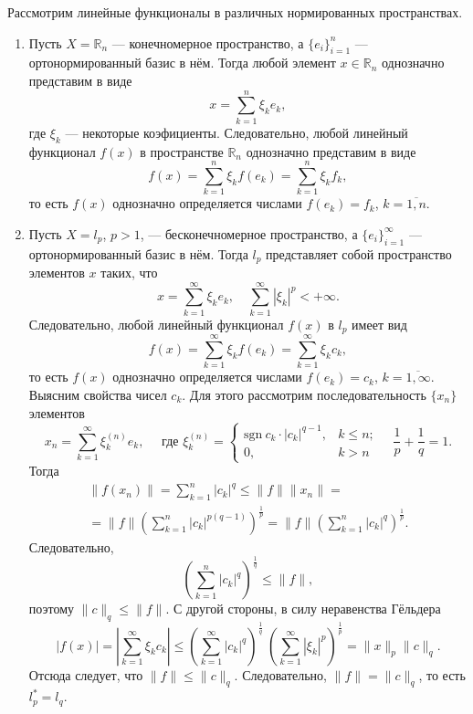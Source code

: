 \documentclass[12pt,a4paper, titlepage]{article}
\begin{document}
Рассмотрим линейные функционалы в различных нормированных пространствах.

\begin{enumerate}
\item
Пусть $X = \mathbb{R}_n$ --- конечномерное пространство, а $\lbrace e_i \rbrace_{i=1}^n$ --- ортонормированный базис в нём. Тогда любой элемент $x \in \mathbb{R}_n$ однозначно представим в виде 
$$
x = \sum_{k=1}^n \xi_k e_k,
$$
где $\xi_k$ --- некоторые коэфициенты. Следовательно, любой линейный функционал $f(x)$ в пространстве $\mathbb{R}_n$ однозначно представим в виде
$$
f(x) = \sum_{k=1}^n \xi_k f(e_k) = \sum_{k=1}^n \xi_k f_k,
$$
то есть $f(x)$ однозначно определяется числами $f(e_k) = f_k$, $k = \overline{1, n}$.

\item
Пусть $X = l_p$, $p > 1$, --- бесконечномерное пространство, а $\lbrace e_i \rbrace_{i=1}^\infty$ --- ортонормированный базис в нём. Тогда $l_p$ представляет собой пространство элементов $x$ таких, что
$$
x = \sum_{k=1}^\infty \xi_k e_k, \quad \sum_{k=1}^\infty |\xi_k |^p < +\infty.
$$
Следовательно, любой линейный функционал $f(x)$ в $l_p$ имеет вид
$$
f(x) = \sum_{k=1}^\infty \xi_k f(e_k) = \sum_{k=1}^\infty \xi_k c_k,
$$
то есть $f(x)$ однозначно определяется числами $f(e_k) = c_k$, $k = \overline{1, \infty}$. Выясним свойства чисел $c_k$. Для этого рассмотрим последовательность $\lbrace x_n \rbrace$ элементов
$$
x_n = \sum_{k=1}^\infty \xi_k^{(n)} e_k, \quad \text{ где } 
\xi_k^{(n)} = \begin{cases}
\mathrm{sgn} \ c_k  \cdot |c_k|^{q-1}, & k \leqslant n; \\
0, & k > n
\end{cases} \quad \frac 1 p + \frac 1 q = 1.
$$
Тогда
\begin{multline*}
\|f(x_n)\| = \sum_{k=1}^n |c_k|^q \leqslant \|f\| \|x_n\| = \\
= \|f\| \left( \sum_{k=1}^n |c_k|^{p(q-1)} \right)^{\frac 1 p} =
\|f\| \left( \sum_{k=1}^n |c_k|^q \right)^{\frac 1 p}.
\end{multline*}
Следовательно,
$$
\left( \sum_{k=1}^n |c_k|^q \right)^{\frac 1 q} \leqslant \|f\|,
$$
поэтому $\|c\|_q \leqslant \|f\|$.
С другой стороны, в силу неравенства Гёльдера
$$
|f(x)| = \left| \sum_{k=1}^\infty \xi_k c_k \right| \leqslant
\left( \sum_{k=1}^\infty |c_k|^q \right)^{\frac 1 q} \ \left( \sum_{k=1}^\infty |\xi_k|^p \right)^{\frac 1 p} = \|x\|_p \|c\|_q.
$$
Отсюда следует, что $\|f\| \leqslant \|c\|_q$. Следовательно, $\|f\| = \|c\|_q$, то есть $l_p^* = l_q$.


\end{enumerate}
\end{document}
